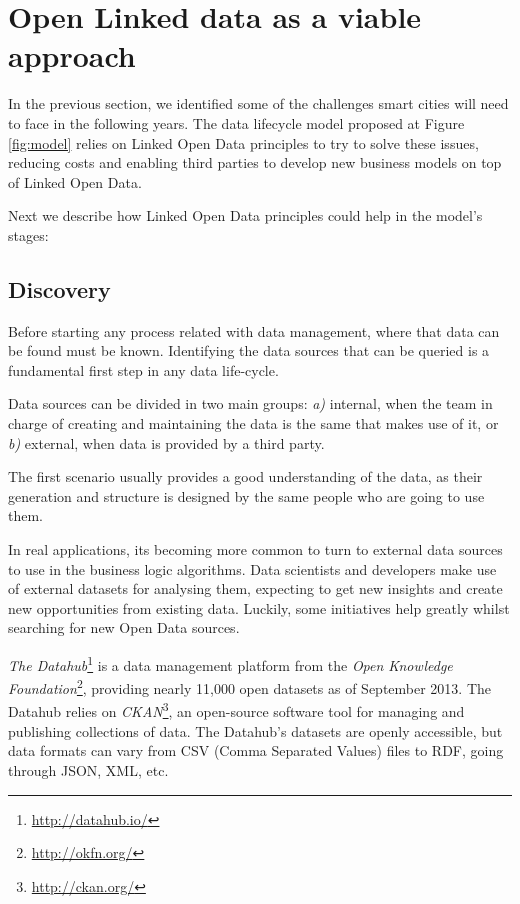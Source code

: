 \section{Open Linked data as a viable approach}

In the previous section, we identified some of the challenges smart cities will need to face in the following years. The data lifecycle model proposed at Figure \ref{fig:model} relies on Linked Open Data principles to try to solve these issues, reducing costs and enabling third parties to develop new business models on top of Linked Open Data.

Next we describe how Linked Open Data principles could help in the model's stages:

\subsection{Discovery}\label{subsec:discovery}

Before starting any process related with data management, where that data can be found must be known. Identifying the data sources that can be queried is a fundamental first step in any data life-cycle.

Data sources can be divided in two main groups: \textit{a)} internal, when the team in charge of creating and maintaining the data is the same that makes use of it, or \textit{b)} external, when data is provided by a third party.

The first scenario usually provides a good understanding of the data, as their generation and structure is designed by the same people who are going to use them.

In real applications, its becoming more common to turn to external data sources to use in the business logic algorithms. Data scientists and developers make use of external datasets for analysing them, expecting to get new insights and create new opportunities from existing data. Luckily, some initiatives help greatly whilst searching for new Open Data sources.

\textit{The Datahub}\footnote{\url{http://datahub.io/}} is a data management platform from the \textit{Open Knowledge Foundation}\footnote{\url{http://okfn.org/}}, providing nearly 11,000 open datasets as of September 2013. The Datahub relies on \textit{CKAN}\footnote{\url{http://ckan.org/}}, an open-source software tool for managing and publishing collections of data. The Datahub's datasets are openly accessible, but data formats can vary from CSV (Comma Separated Values) files to RDF, going through JSON, XML, etc.

